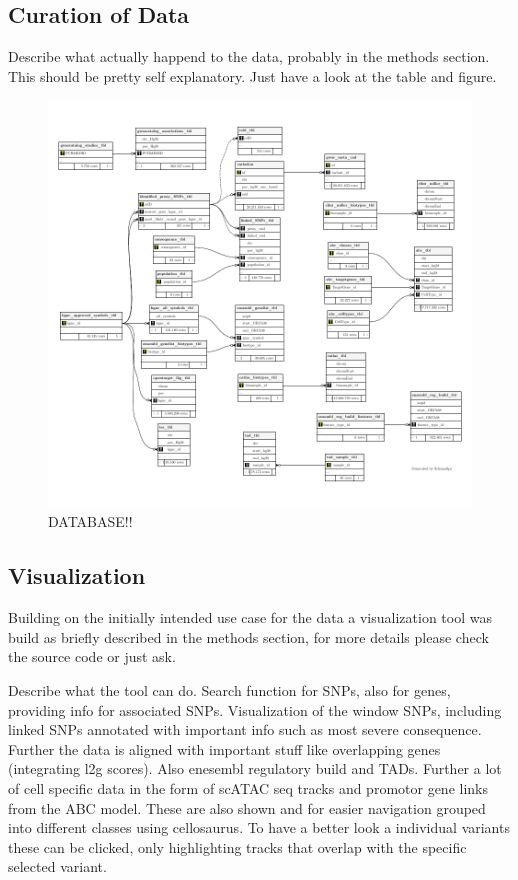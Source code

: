     \subsection{Curation of Data}
    Describe what actually happend to the data, probably in the methods section.
    This should be pretty self explanatory. Just have a look at the table and figure.

    \begin{figure}[h]
    \capstart
        \centering
    	\includegraphics{Abbildung/db-schema.pdf}

    	\begin{minipage}{\captionwidth}
    		\caption[database]{ \newline DATABASE!!}
    		\label{fig:db}
    	\end{minipage}
    \end{figure}

    \subsection{Visualization}
    \label{subsec:result_vis}
    Building on the initially intended use case for the data a visualization tool was build as briefly described in the methods section, for more details please check the source code or just ask.

    Describe what the tool can do. Search function for SNPs, also for genes, providing info for associated SNPs. Visualization of the window SNPs, including linked SNPs annotated with important info such as most severe consequence. Further the data is aligned with important stuff like overlapping genes (integrating l2g scores). Also enesembl regulatory build and TADs. Further a lot of cell specific data in the form of scATAC seq tracks and promotor gene links from the ABC model. These are also shown and for easier navigation grouped into different classes using cellosaurus. To have a better look a individual variants these can be clicked, only highlighting tracks that overlap with the specific selected variant.


